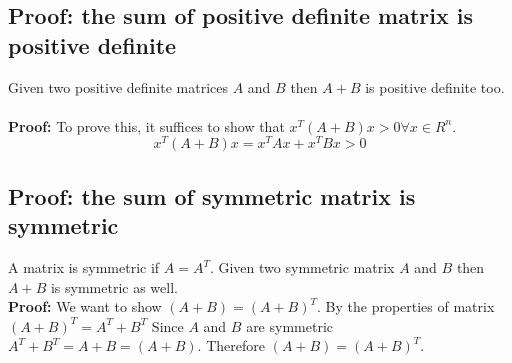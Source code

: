 \documentclass[12pt]{article}
\begin{document}
\subsection*{Proof: the sum of positive definite matrix is positive definite}
\label{sec:proof_pd}
Given two positive definite matrices $A$ and $B$ then $A+B$ is positive definite too. \\ \\
\textbf{Proof:}
To prove this, it suffices to show that $x^T (A+B) x > 0 \forall x \in R^n $. \\

$$x^T (A+B) x = x^T A x + x^T B x > 0 $$ 


\subsection*{Proof: the sum of symmetric matrix is symmetric}
\label{sec:proof_sym}
A matrix is symmetric if $A=A^T$. Given two symmetric matrix $A$ and $B$ then $A+B$ is symmetric as well. \\

\textbf{Proof:} We want to show $(A+B)=(A+B)^T$. By the properties of matrix $(A+B)^T = A^T + B^T$ Since $A$ and $B$ are symmetric  $ A^T + B^T = A + B = (A+B) $. Therefore $(A+B)=(A+B)^T$.
\end{document}
